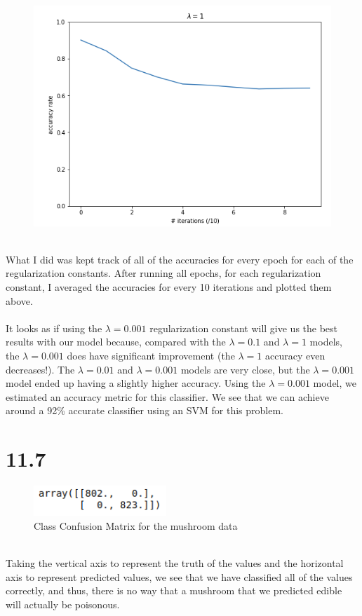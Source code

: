 \documentclass[11pt]{article}
\begin{document}
\clearpage
\begin{figure}[h!]
	\centering
	\includegraphics[width=125mm]{graph_4.png}
\end{figure}
\ \\
What I did was kept track of all of the accuracies for every epoch for each of the regularization constants. After running all epochs, for each regularization constant, I averaged the accuracies for every 10 iterations and plotted them above. \\ \\
It looks as if using the $\lambda=0.001$ regularization constant will give us the best results with our model because, compared with the $\lambda=0.1$ and $\lambda=1$ models, the $\lambda=0.001$ does have significant improvement (the $\lambda=1$ accuracy even decreases!). The $\lambda=0.01$ and $\lambda=0.001$ models are very close, but the $\lambda=0.001$ model ended up having a slightly higher accuracy. Using the $\lambda=0.001$ model, we estimated an accuracy metric for this classifier. We see that we can achieve around a 92\% accurate classifier using an SVM for this problem.
\section*{11.7}
\begin{figure}[h!]
	\centering
	\includegraphics[width=50mm]{ccm.png}
	\caption{Class Confusion Matrix for the mushroom data}
\end{figure}
\ \\
Taking the vertical axis to represent the truth of the values and the horizontal axis to represent predicted values, we see that we have classified all of the values correctly, and thus, there is no way that a mushroom that we predicted edible will actually be poisonous.
\end{document}
